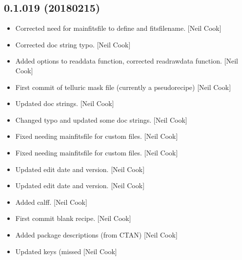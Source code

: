 \documentclass[a4paper,10pt,english]{report}
\begin{document}
\subsection{0.1.019 (2018\sphinxhyphen{}02\sphinxhyphen{}15)}
\label{\detokenize{misc/changelog:id503}}\begin{itemize}
\item {} 
Corrected need for mainfitsfile to define  and
fitsfilename. {[}Neil Cook{]}

\item {} 
Corrected doc string typo. {[}Neil Cook{]}

\item {} 
Added  options to readdata function,
corrected readrawdata function. {[}Neil Cook{]}

\item {} 
First commit of telluric mask file (currently a pseudo\sphinxhyphen{}recipe) {[}Neil
Cook{]}

\item {} 
Updated doc strings. {[}Neil Cook{]}

\item {} 
Changed typo and updated some doc strings. {[}Neil Cook{]}

\item {} 
Fixed needing mainfitsfile for custom files. {[}Neil Cook{]}

\item {} 
Fixed needing mainfitsfile for custom files. {[}Neil Cook{]}

\item {} 
Updated edit date and version. {[}Neil Cook{]}

\item {} 
Updated edit date and version. {[}Neil Cook{]}

\item {} 
Added calff. {[}Neil Cook{]}

\item {} 
First commit \sphinxhyphen{} blank  recipe. {[}Neil Cook{]}

\item {} 
Added package descriptions (from CTAN) {[}Neil Cook{]}

\item {} 
Updated keys (missed  {[}Neil Cook{]}

\end{itemize}
\end{document}
